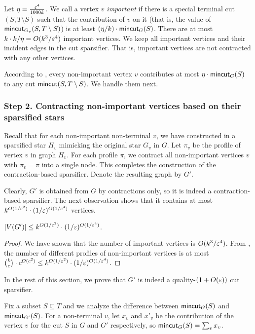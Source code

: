 Let $\eta = \frac{{\varepsilon}^4}{1000k}$. We call a vertex $v$ \emph{important} if there is a special terminal cut $(S,T\setminus S)$ such that the contribution of $v$ on it (that is, the value of $\mathsf{mincut}_{G_v}(S,T\setminus S)$) is at least $(\eta/k)\cdot \mathsf{mincut}_G(S)$. There are at most $k \cdot k/\eta  = O(k^3/{\varepsilon}^4)$ important vertices. We keep all important vertices and their incident edges in the cut sparsifier. That is, important vertices are not contracted with any other vertices.

According to , every non-important vertex $v$ contributes at most $\eta \cdot \mathsf{mincut}_G(S)$ to any cut $\mathsf{mincut}(S,T\setminus S)$. We handle them next.



\subsubsection*{Step 2. Contracting non-important vertices based on their sparsified stars}

Recall that for each non-important non-terminal $v$, we have constructed in  a sparsified star $H_v$ mimicking the original star $G_v$ in $G$. Let $\pi_v$ be the profile of vertex $v$ in graph $H_v$. For each profile $\pi$, we contract all non-important vertices $v$ with $\pi_v=\pi$ into a single node. This completes the construction of the contraction-based sparsifier. Denote the resulting graph by $G'$.

Clearly, $G'$ is obtained from $G$ by contractions only, so it is indeed a contraction-based sparsifier. The next observation shows that it contains at most 
$k^{O(1/{\varepsilon}^2)}\cdot (1/{\varepsilon})^{O(1/{\varepsilon}^4)}$ vertices.

\begin{observation}
$|V(G')|\le k^{O(1/{\varepsilon}^2)}\cdot (1/{\varepsilon})^{O(1/{\varepsilon}^4)}$.
\end{observation} 
\begin{proof}
We have shown that the number of important vertices is $O(k^3/{\varepsilon}^4)$. From , the number of different profiles of non-important vertices is at most $\binom{k}{c}\cdot c^{O(c^2)}\le k^{O(1/{\varepsilon}^2)}\cdot (1/{\varepsilon})^{O(1/{\varepsilon}^4)}$.
\end{proof}

In the rest of this section, we prove that $G'$ is indeed a quality-$(1+O({\varepsilon}))$ cut sparsifier.

Fix a subset $S\subseteq T$ and we analyze the difference between $\mathsf{mincut}_G(S)$ and $\mathsf{mincut}_{G'}(S)$.
For a non-terminal $v$, let $x_v$ and $x'_v$ be the contribution of the vertex $v$ for the cut $S$ in $G$ and $G'$ respectively, so $\mathsf{mincut}_G(S) = \sum_v x_v$. 

